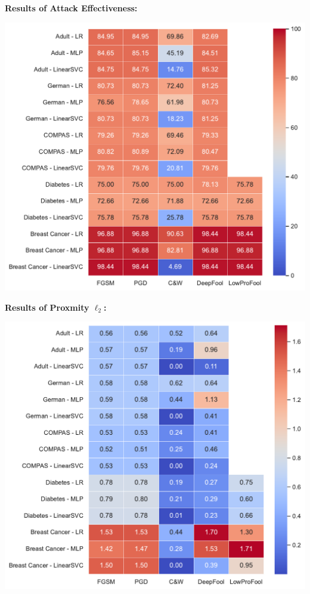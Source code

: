 \documentclass[portrait,a0paper]{baposter}
\begin{document}
\begin{poster}
{        \textbf{\color{blue}Results of Attack Effectiveness:}
        \begin{center}
            \vspace{-0.8em}
            \includegraphics[width=\textwidth]{images/asr_rgb.pdf}
        \end{center}
        \vspace{-0.4em}
        \textbf{\color{blue}Results of Proxmity $\ell_2$:}
        \begin{center}
            \vspace{-0.7em}
            \includegraphics[width=\textwidth]{images/l2_rgb.pdf}
        \end{center}

}
\end{poster}
\end{document}
